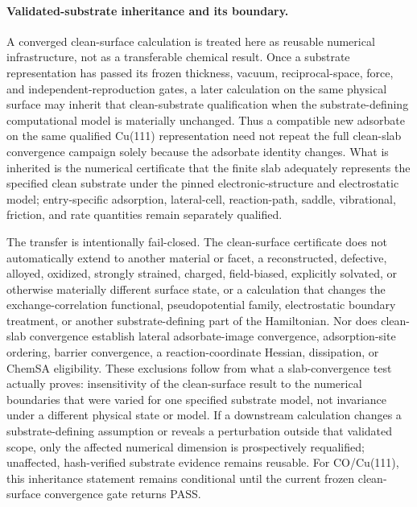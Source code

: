 
\paragraph{Validated-substrate inheritance and its boundary.}
A converged clean-surface calculation is treated here as reusable numerical infrastructure, not as a transferable chemical result.  Once a substrate representation has passed its frozen thickness, vacuum, reciprocal-space, force, and independent-reproduction gates, a later calculation on the same physical surface may inherit that clean-substrate qualification when the substrate-defining computational model is materially unchanged.  Thus a compatible new adsorbate on the same qualified Cu(111) representation need not repeat the full clean-slab convergence campaign solely because the adsorbate identity changes.  What is inherited is the numerical certificate that the finite slab adequately represents the specified clean substrate under the pinned electronic-structure and electrostatic model; entry-specific adsorption, lateral-cell, reaction-path, saddle, vibrational, friction, and rate quantities remain separately qualified.

The transfer is intentionally fail-closed.  The clean-surface certificate does not automatically extend to another material or facet, a reconstructed, defective, alloyed, oxidized, strongly strained, charged, field-biased, explicitly solvated, or otherwise materially different surface state, or a calculation that changes the exchange-correlation functional, pseudopotential family, electrostatic boundary treatment, or another substrate-defining part of the Hamiltonian.  Nor does clean-slab convergence establish lateral adsorbate-image convergence, adsorption-site ordering, barrier convergence, a reaction-coordinate Hessian, dissipation, or ChemSA eligibility.  These exclusions follow from what a slab-convergence test actually proves: insensitivity of the clean-surface result to the numerical boundaries that were varied for one specified substrate model, not invariance under a different physical state or model.  If a downstream calculation changes a substrate-defining assumption or reveals a perturbation outside that validated scope, only the affected numerical dimension is prospectively requalified; unaffected, hash-verified substrate evidence remains reusable.  For CO/Cu(111), this inheritance statement remains conditional until the current frozen clean-surface convergence gate returns PASS.